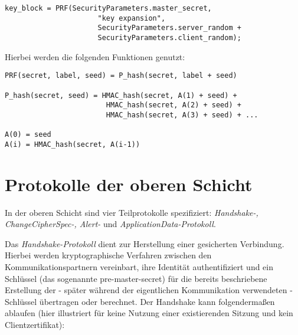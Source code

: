 \documentclass[
    12pt,
    headings=small,
    parskip=half,           %
    bibliography=totoc,
    numbers=noenddot,       %
    open=any,               %
    ]{scrreprt}
\newcommand{\premastersecret}		{pre-master-secret}
\begin{document}
\begin{lstlisting}
key_block = PRF(SecurityParameters.master_secret,
                      "key expansion",
                      SecurityParameters.server_random +
                      SecurityParameters.client_random);
\end{lstlisting}

Hierbei werden die folgenden Funktionen genutzt:

\begin{lstlisting}
PRF(secret, label, seed) = P_hash(secret, label + seed)

P_hash(secret, seed) = HMAC_hash(secret, A(1) + seed) +
						HMAC_hash(secret, A(2) + seed) +
						HMAC_hash(secret, A(3) + seed) + ...

A(0) = seed
A(i) = HMAC_hash(secret, A(i-1))
\end{lstlisting}


\section{Protokolle der oberen Schicht}

In der oberen Schicht sind vier Teilprotokolle spezifiziert: \emph{Handshake-, ChangeCipherSpec-, Alert-} und \emph{ApplicationData-Protokoll}.

Das \emph{Handshake-Protokoll} dient zur Herstellung einer gesicherten Verbindung. Hierbei werden kryptographische Verfahren zwischen den Kommunikationspartnern vereinbart, ihre Identität authentifiziert und ein Schlüssel (das sogenannte \premastersecret{}) für die bereits beschriebene Erstellung der - später während der eigentlichen Kommunikation verwendeten - Schlüssel übertragen oder berechnet. Der Handshake kann folgendermaßen ablaufen (hier illustriert für keine Nutzung einer existierenden Sitzung und kein Clientzertifikat): 

\end{document}
